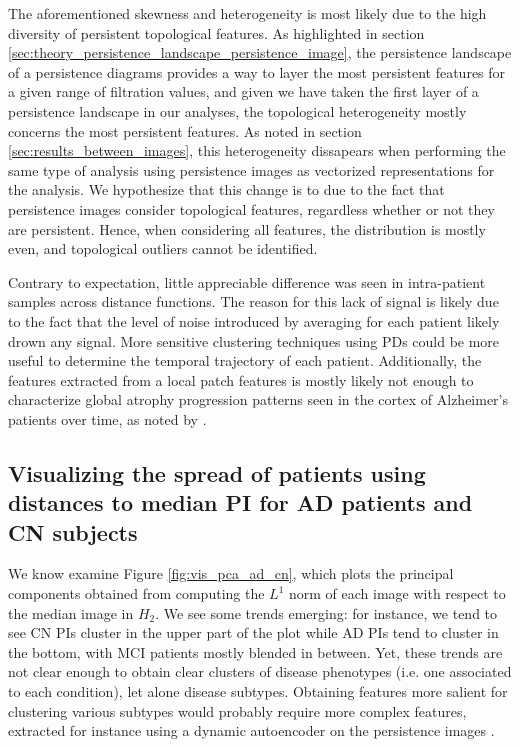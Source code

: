 \documentclass{article}
\begin{document}
The aforementioned skewness and heterogeneity is most likely due to the high diversity of persistent topological features. As highlighted in section \ref{sec:theory_persistence_landscape_persistence_image}, the persistence landscape of a persistence diagrams provides a way to layer the most persistent features for a given range of filtration values, and given we have taken the first layer of a persistence landscape in our analyses, the topological heterogeneity mostly concerns the most persistent features. As noted in section \ref{sec:results_between_images}, this heterogeneity dissapears when performing the same type of analysis using persistence images as vectorized representations for the analysis. We hypothesize that this change is to due to the fact that persistence images consider topological features, regardless whether or not they are persistent. Hence, when considering all features, the distribution is mostly even, and topological outliers cannot be identified.

Contrary to expectation, little appreciable difference was seen in intra-patient samples across distance functions. The reason for this lack of signal is likely due to the fact that the level of noise introduced by averaging for each patient likely drown any signal. More sensitive clustering techniques using PDs could be more useful to determine the temporal trajectory of each patient. Additionally, the features extracted from a local patch features is mostly likely not enough to characterize global atrophy progression patterns seen in the cortex of Alzheimer's patients over time, as noted by \citep{toniolo2018patterns}.

\subsection{Visualizing the spread of patients using distances to median PI for AD patients and CN subjects}

We know examine Figure \ref{fig:vis_pca_ad_cn}, which plots the principal components obtained from computing the $L^1$ norm of each image with respect to the median image in $H_2$. We see some trends emerging: for instance, we tend to see CN PIs cluster in the upper part of the plot while AD PIs tend to cluster in the bottom, with MCI patients mostly blended in between. Yet, these trends are not clear enough to obtain clear clusters of disease phenotypes (i.e. one associated to each condition), let alone disease subtypes. Obtaining features more salient for clustering various subtypes would probably require more complex features, extracted for instance using a dynamic autoencoder on the persistence images \citep{mrabah2019deep}.
\end{document}
